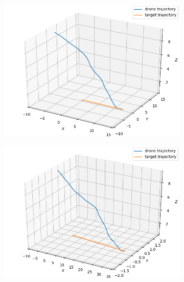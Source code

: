 \documentclass[conf]{new-aiaa}
\begin{document}
\begin{figure}
  \begin{subfigure}{0.5\textwidth}
    \includegraphics[width=\linewidth]{baseline1.png}
    \caption{} \label{fig:baseline1}
  \end{subfigure}%
  \hspace*{\fill}   %
  \begin{subfigure}{0.5\textwidth}
    \includegraphics[width=\linewidth]{baseline3.png}
    \caption{} \label{fig:baseline3}
  \end{subfigure}%
  \hspace*{\fill}   %
  \\

\end{figure}
\end{document}
